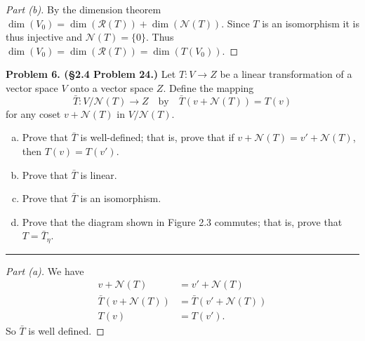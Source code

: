 \documentclass[leqno]{article}
\theoremstyle{nonumberplain}
\newtheorem{proof}{Proof}
\begin{document}
\begin{proof}[Part (b)]
By the dimension theorem $\dim(V_0)=\dim(\mathcal{R}(T))+\dim(\mathcal{N}(T))$.  Since $T$ is an isomorphism it is thus injective and $\mathcal{N}(T)=\{0\}$. Thus $\dim(V_0)=\dim(\mathcal{R}(T))=\dim(T(V_0))$.
\end{proof}


\pagebreak




\noindent\textbf{Problem 6. (\S 2.4 Problem 24.)} Let $T\colon V\to Z$ be a linear transformation of a vector space $V$ onto a vector space $Z$. Define the mapping
\[
\bar{T}\colon V/\mathcal{N}(T) \to Z \textrm{~~ by ~~} \bar{T}(v+\mathcal{N}(T))=T(v)
\]
for any coset $v+\mathcal{N}(T)$ in $V/\mathcal{N}(T)$.
\begin{enumerate}[(a)]
\item Prove that $\bar{T}$ is well-defined; that is, prove that if $v+\mathcal{N}(T)=v'+\mathcal{N}(T)$, then $T(v)=T(v')$.
\item Prove that $\bar{T}$ is linear.
\item Prove that $\bar{T}$ is an isomorphism.
\item Prove that the diagram shown in Figure 2.3 commutes; that is, prove that $T=\bar{T}_\eta$.\\

\centering
{}


\end{enumerate}

\noindent\rule[0.5ex]{\linewidth}{1pt}

\begin{proof}[Part (a)]
We have
\begin{align*}
v+\mathcal{N}(T)&=v'+\mathcal{N}(T)\\
\bar{T}(v+\mathcal{N}(T))&=\bar{T}(v'+\mathcal{N}(T))\\
T(v)&=T(v').
\end{align*}
So $\bar{T}$ is well defined.
\end{proof}
\end{document}
